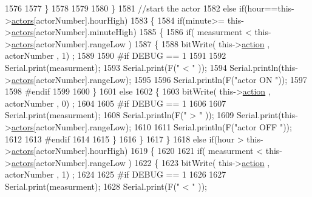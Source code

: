 \begin{DoxyCode}
1576             
1577         \}
1578 
1579 
1580     \}
1581     \textcolor{comment}{//start the actor}
1582     \textcolor{keywordflow}{else} \textcolor{keywordflow}{if}(hour==this->\hyperlink{class_jetpack_a7e16d2f97837f9712a2e6de1c50d99db}{actors}[actorNumber].hourHigh)
1583     \{
1584         \textcolor{keywordflow}{if}(minute>= this->\hyperlink{class_jetpack_a7e16d2f97837f9712a2e6de1c50d99db}{actors}[actorNumber].minuteHigh)
1585         \{
1586             \textcolor{keywordflow}{if}( measurment < this->\hyperlink{class_jetpack_a7e16d2f97837f9712a2e6de1c50d99db}{actors}[actorNumber].rangeLow )
1587             \{
1588                 bitWrite( this->\hyperlink{class_jetpack_aca3142925a7b0834b34ae91d26af7765}{action} , actorNumber , 1) ;
1589 
1590 \textcolor{preprocessor}{            #if DEBUG == 1 }
1591 
1592                 Serial.print(measurment);
1593                 Serial.print(F(\textcolor{stringliteral}{" < "} ));
1594                 Serial.println(this->\hyperlink{class_jetpack_a7e16d2f97837f9712a2e6de1c50d99db}{actors}[actorNumber].rangeLow);
1595 
1596                 Serial.println(F(\textcolor{stringliteral}{"actor ON "}));
1597 
1598 \textcolor{preprocessor}{            #endif  }
1599 
1600             \}
1601             \textcolor{keywordflow}{else} 
1602             \{
1603                 bitWrite( this->\hyperlink{class_jetpack_aca3142925a7b0834b34ae91d26af7765}{action} , actorNumber , 0) ;
1604 
1605 \textcolor{preprocessor}{            #if DEBUG == 1 }
1606 
1607                 Serial.print(measurment);
1608                 Serial.println(F(\textcolor{stringliteral}{" > "} ));
1609                 Serial.print(this->\hyperlink{class_jetpack_a7e16d2f97837f9712a2e6de1c50d99db}{actors}[actorNumber].rangeLow);
1610 
1611                 Serial.println(F(\textcolor{stringliteral}{"actor OFF "}));
1612 
1613 \textcolor{preprocessor}{            #endif  }
1614                 
1615             \}
1616         \}
1617     \}
1618     \textcolor{keywordflow}{else} \textcolor{keywordflow}{if}(hour > this->\hyperlink{class_jetpack_a7e16d2f97837f9712a2e6de1c50d99db}{actors}[actorNumber].hourHigh)
1619     \{
1620 
1621         \textcolor{keywordflow}{if}( measurment < this->\hyperlink{class_jetpack_a7e16d2f97837f9712a2e6de1c50d99db}{actors}[actorNumber].rangeLow )
1622         \{
1623             bitWrite( this->\hyperlink{class_jetpack_aca3142925a7b0834b34ae91d26af7765}{action} , actorNumber , 1) ;
1624 
1625 \textcolor{preprocessor}{        #if DEBUG == 1 }
1626 
1627             Serial.print(measurment);
1628             Serial.print(F(\textcolor{stringliteral}{" < "} ));

\end{DoxyCode}
